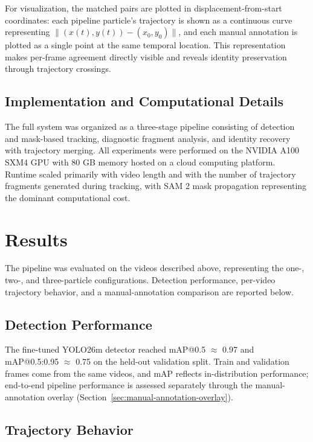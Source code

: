 \documentclass[conference]{IEEEtran}
\begin{document}
For visualization, the matched pairs are plotted in displacement-from-start coordinates: each pipeline particle's trajectory is shown as a continuous curve representing $\|(x(t), y(t)) - (x_0, y_0)\|$, and each manual annotation is plotted as a single point at the same temporal location. This representation makes per-frame agreement directly visible and reveals identity preservation through trajectory crossings.

\subsection{Implementation and Computational Details}

The full system was organized as a three-stage pipeline consisting of detection and mask-based tracking, diagnostic fragment analysis, and identity recovery with trajectory merging. All experiments were performed on the NVIDIA A100 SXM4 GPU with 80 GB memory hosted on a cloud computing platform. Runtime scaled primarily with video length and with the number of trajectory fragments generated during tracking, with SAM 2 mask propagation representing the dominant computational cost.


\section{Results}

The pipeline was evaluated on the videos described above, representing the one-, two-, and three-particle configurations. Detection performance, per-video trajectory behavior, and a manual-annotation comparison are reported below.

\subsection{Detection Performance}

The fine-tuned YOLO26m detector reached mAP@0.5 $\approx$ 0.97 and mAP@0.5:0.95 $\approx$ 0.75 on the held-out validation split. Train and validation frames come from the same videos, and mAP reflects in-distribution performance; end-to-end pipeline performance is assessed separately through the manual-annotation overlay (Section~\ref{sec:manual-annotation-overlay}).

\subsection{Trajectory Behavior}
\end{document}
